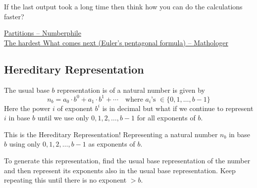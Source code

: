 \begin{noteI}
If the last output took a long time then think how you can do the calculations faster?
\end{noteI}
\begin{funvideo}
\href{https://youtu.be/NjCIq58rZ8I}{Partitions -- Numberphile}\\
\href{https://youtu.be/iJ8pnCO0nTY}{The hardest What comes next (Euler's pentagonal formula) -- Mathologer}
\end{funvideo}
\recalctypearea
\subsection{Hereditary Representation}
The usual base $b$ representation is of a natural number is given by
\begin{equation}
 	n_b = a_0 \cdot b^0 + a_1 \cdot b^1 + \cdots \quad\text{where $a_i$'s $\in \{0,1,\ldots,b-1\}$}
\end{equation} Here the power $i$ of exponent $b^i$ is in decimal but what if we continue to represent $i$ in base $b$ until we use only $0, 1, 2, \ldots, b-1$ for all exponents of $b$.

This is the Hereditary Representation! Representing a natural number $n_b$ in base $b$ using only $0, 1, 2, \ldots, b-1$ as exponents of $b$.

To generate this representation, find the usual base representation of the number and then represent its exponents also in the usual base representation. Keep repeating this until there is no exponent $> b$.

